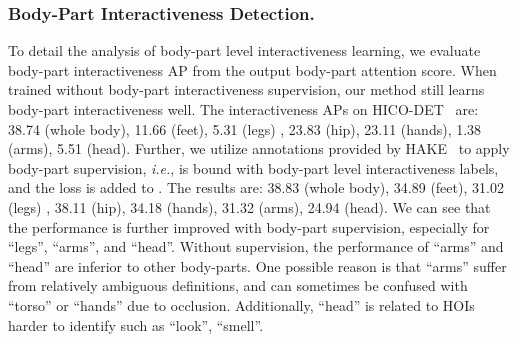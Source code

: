 \documentclass[runningheads]{llncs}
\begin{document}
\subsubsection{Body-Part Interactiveness Detection.}
To detail the analysis of body-part level interactiveness learning, we evaluate body-part interactiveness AP from the output body-part attention score. 
When trained without body-part interactiveness supervision, our method still learns body-part interactiveness well. The interactiveness APs on HICO-DET~\cite{hicodet} are:  38.74 (whole body), 11.66 (feet), 5.31 (legs) , 23.83 (hip), 23.11 (hands), 1.38 (arms), 5.51 (head).
Further, we utilize annotations provided by HAKE~\cite{hake,li2022hake} to apply body-part supervision,
\textit{i.e.},  is bound with body-part level interactiveness labels, and the loss is added to .
The results are: 38.83 (whole body), 34.89 (feet), 31.02 (legs) , 38.11 (hip), 34.18 (hands), 31.32 (arms), 24.94 (head).
We can see that the performance is further improved with body-part supervision, especially for ``legs'', ``arms'', and ``head''.
Without supervision, the performance of ``arms'' and ``head'' are inferior to other body-parts. 
One possible reason is that ``arms'' suffer from relatively ambiguous definitions, and can sometimes be confused with ``torso'' or ``hands'' due to occlusion. Additionally, ``head'' is related to HOIs harder to identify such as ``look'', ``smell''.


\begin{table}
\centering
{}
\caption{Results on VCOCO~\cite{vcoco}.}
\label{tab:vcoco}
\end{table}
\end{document}
